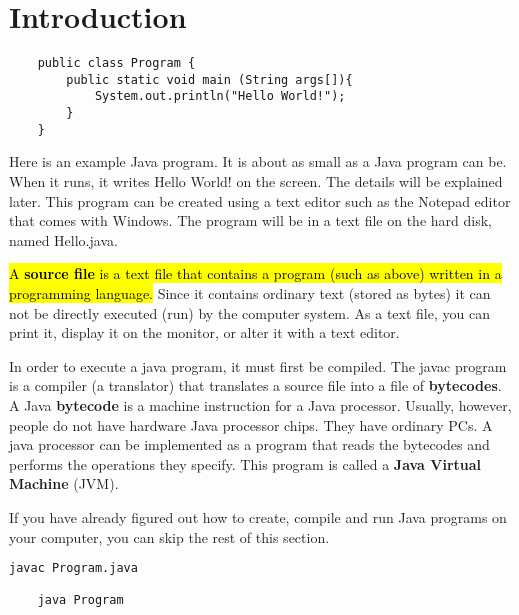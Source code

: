 \documentclass[Main.tex]{subfiles}
\begin{document}
    \section{Introduction}

    \begin{lstlisting}
    public class Program {
        public static void main (String args[]){
            System.out.println("Hello World!");
        }
    }\end{lstlisting}

    Here is an example Java program. It is about as small as a Java program can be. When it runs, it writes Hello
World! on the screen. The details will be explained later. This program can be created using a text editor
such as the Notepad editor that comes with Windows. The program will be in a text file on the hard disk, named
Hello.java.

    \hl{A \textbf{source file} is a text file that contains a program (such as above) written in a programming
language.} Since it contains ordinary text (stored as bytes) it can not be directly executed (run) by the computer
system. As a text file, you can print it, display it on the monitor, or alter it with a text editor.

    In order to execute a java program, it must first be compiled. The javac program is a compiler (a translator) that
translates a source file into a file of \textbf{bytecodes}. A Java \textbf{bytecode} is a machine instruction for a
Java processor. Usually, however, people do not have hardware Java processor chips. They have ordinary PCs. A java
processor can be implemented as a program that reads the bytecodes and performs the operations they specify.
This program is called a \textbf{Java Virtual Machine} (JVM).

    If you have already figured out how to create, compile and run Java programs on your computer, you can skip the rest
of this section.
\begin{lstlisting}[language=bash]
    javac Program.java

    java Program\end{lstlisting}
\end{document}
